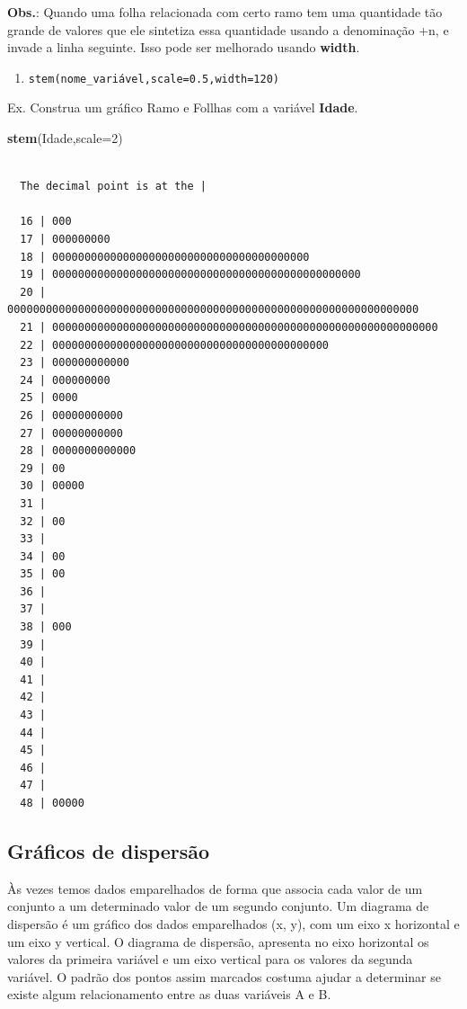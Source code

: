\documentclass[12pt,brazil,oneside]{book}
\newenvironment{Shaded}{\begin{snugshade}}{\end{snugshade}}
\newcommand{\DataTypeTok}[1]{\textcolor[rgb]{0.13,0.29,0.53}{#1}}
\newcommand{\DecValTok}[1]{\textcolor[rgb]{0.00,0.00,0.81}{#1}}
\newcommand{\KeywordTok}[1]{\textcolor[rgb]{0.13,0.29,0.53}{\textbf{#1}}}
\newcommand{\NormalTok}[1]{#1}
\providecommand{\tightlist}{%
  \setlength{\itemsep}{0pt}\setlength{\parskip}{0pt}}
\begin{document}
\textbf{Obs.}: Quando uma folha relacionada com certo ramo tem uma
quantidade tão grande de valores que ele sintetiza essa quantidade
usando a denominação +n, e invade a linha seguinte. Isso pode ser
melhorado usando \textbf{width}.

\begin{enumerate}
\def\labelenumi{\alph{enumi})}
\setcounter{enumi}{2}
\tightlist
\item
  \texttt{stem(nome\_variável,scale=0.5,width=120)}
\end{enumerate}

Ex. Construa um gráfico Ramo e Follhas com a variável \textbf{Idade}.

\begin{Shaded}
\begin{Highlighting}[]
\KeywordTok{stem}\NormalTok{(Idade,}\DataTypeTok{scale=}\DecValTok{2}\NormalTok{)}
\end{Highlighting}
\end{Shaded}

\begin{verbatim}

  The decimal point is at the |

  16 | 000
  17 | 000000000
  18 | 0000000000000000000000000000000000000000
  19 | 000000000000000000000000000000000000000000000000
  20 | 0000000000000000000000000000000000000000000000000000000000000000
  21 | 000000000000000000000000000000000000000000000000000000000000
  22 | 0000000000000000000000000000000000000000000
  23 | 000000000000
  24 | 000000000
  25 | 0000
  26 | 00000000000
  27 | 00000000000
  28 | 0000000000000
  29 | 00
  30 | 00000
  31 | 
  32 | 00
  33 | 
  34 | 00
  35 | 00
  36 | 
  37 | 
  38 | 000
  39 | 
  40 | 
  41 | 
  42 | 
  43 | 
  44 | 
  45 | 
  46 | 
  47 | 
  48 | 00000
\end{verbatim}

\hypertarget{graficos-de-dispersao}{%
\subsection{Gráficos de dispersão}\label{graficos-de-dispersao}}

Às vezes temos dados emparelhados de forma que associa cada valor de um
conjunto a um determinado valor de um segundo conjunto. Um diagrama de
dispersão é um gráfico dos dados emparelhados (x, y), com um eixo x
horizontal e um eixo y vertical. O diagrama de dispersão, apresenta no
eixo horizontal os valores da primeira variável e um eixo vertical para
os valores da segunda variável. O padrão dos pontos assim marcados
costuma ajudar a determinar se existe algum relacionamento entre as duas
variáveis A e B.
\end{document}
